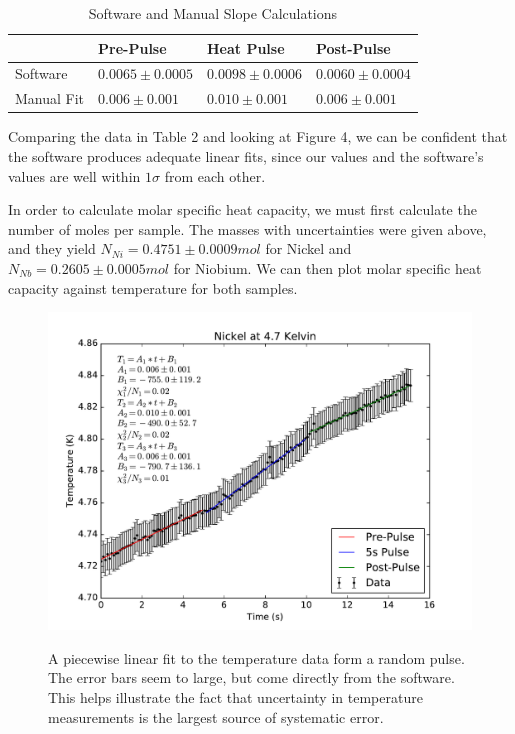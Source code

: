 \documentclass{article}
\begin{document}
\begin{table}[]
\centering
\caption{Software and Manual Slope Calculations}
\label{low-table}
\begin{tabular}{@{}llll@{}}
\toprule
           & Pre-Pulse           & Heat Pulse          & Post-Pulse          \\ \midrule
Software   & $0.0065 \pm 0.0005$ & $0.0098 \pm 0.0006$ & $0.0060 \pm 0.0004$ \\
Manual Fit & $0.006 \pm 0.001$   & $0.010 \pm 0.001$   & $0.006 \pm 0.001$   \\ \bottomrule
\end{tabular}
\end{table}

\hspace{.25cm}

Comparing the data in Table 2 and looking at Figure 4, we can be confident that the software produces adequate linear fits, since our values and the software's values are well within $1\sigma$ from each other.

\hspace{.25cm}

In order to calculate molar specific heat capacity, we must first calculate the number of moles per sample. The masses with uncertainties were given above, and they yield $N_{Ni} = 0.4751 \pm 0.0009 mol$ for Nickel and $N_{Nb} = 0.2605 \pm 0.0005 mol$ for Niobium. We can then plot molar specific heat capacity against temperature for both samples.

\begin{figure}[!htb]
	\centering
	\includegraphics[scale=.75]{plots/low-fit.pdf}
 	\label{lNickel}
	\caption{A piecewise linear fit to the temperature data form a random pulse. The error bars seem to large, but come directly from the software. This helps illustrate the fact that uncertainty in temperature measurements is the largest source of systematic error.}
\end{figure}
\end{document}
